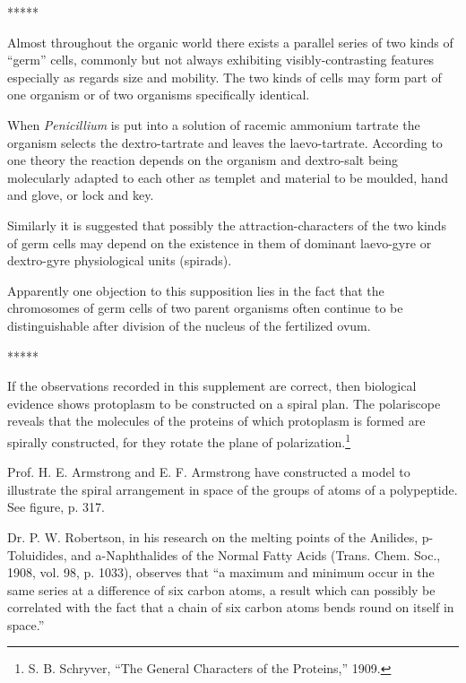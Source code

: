 \documentclass[a4paper, 12pt, oneside]{article}
\begin{document}
\centerline{*\hspace{15mm}*\hspace{15mm}*\hspace{15mm}*\hspace{15mm}*}
\bigskip

Almost throughout the organic world there exists a parallel series of two kinds of ``germ'' cells, commonly but not always exhibiting visibly-contrasting features especially as regards size and mobility. The two kinds of cells may form part of one organism or of two organisms specifically identical.

When \emph{Penicillium} is put into a solution of racemic ammonium tartrate the organism selects the dextro-tartrate and leaves the laevo-tartrate. According to one theory the reaction depends on the organism and dextro-salt being molecularly adapted to each other as templet and material to be moulded, hand and glove, or lock and key.

Similarly it is suggested that possibly the attraction-characters of the two kinds of germ cells may depend on the existence in them of dominant laevo-gyre or dextro-gyre physiological units (spirads).

Apparently one objection to this supposition lies in the fact that the chromosomes of germ cells of two parent organisms often continue to be distinguishable after division of the nucleus of the fertilized ovum.

\centerline{*\hspace{15mm}*\hspace{15mm}*\hspace{15mm}*\hspace{15mm}*}
\bigskip

If the observations recorded in this supplement are correct, then biological evidence shows protoplasm to be constructed on a spiral plan. The polariscope reveals that the molecules of the proteins of which protoplasm is formed are spirally constructed, for they rotate the plane of polarization.\footnote{S. B. Schryver, ``The General Characters of the Proteins,'' 1909.}

Prof. H. E. Armstrong and E. F. Armstrong have constructed a model to illustrate the spiral arrangement in space of the groups of atoms of a polypeptide. See figure, p. 317.

Dr. P. W. Robertson, in his research on the melting points of the Anilides, p-Toluidides, and a-Naphthalides of the Normal Fatty Acids (Trans. Chem. Soc., 1908, vol. 98, p. 1033), observes that ``a maximum and minimum occur in the same series at a difference of six carbon atoms, a result which can possibly be correlated with the fact that a chain of six carbon atoms bends round on itself in space.''
\end{document}
